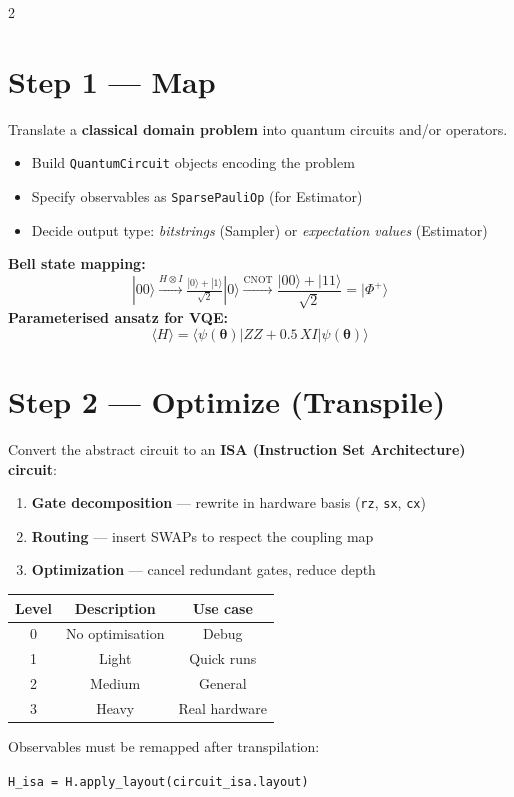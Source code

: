 ﻿\documentclass[10pt, a4paper]{article}
\begin{document}
\begin{multicols}{2}
\section{Step 1 --- Map}
Translate a \textbf{classical domain problem} into quantum circuits and/or operators.
\begin{itemize}
  \item Build \texttt{QuantumCircuit} objects encoding the problem
  \item Specify observables as \texttt{SparsePauliOp} (for Estimator)
  \item Decide output type: \emph{bitstrings} (Sampler) or \emph{expectation values} (Estimator)
\end{itemize}
\noindent\textbf{Bell state mapping:}
\[
  |00\rangle \xrightarrow{H \otimes I} \tfrac{|0\rangle+|1\rangle}{\sqrt{2}}|0\rangle
  \xrightarrow{\text{CNOT}} \frac{|00\rangle+|11\rangle}{\sqrt{2}} = |\Phi^+\rangle
\]
\noindent\textbf{Parameterised ansatz for VQE:}
\[
  \langle H\rangle = \langle\psi(\boldsymbol\theta)|ZZ + 0.5\,XI|\psi(\boldsymbol\theta)\rangle
\]

\section{Step 2 --- Optimize (Transpile)}
Convert the abstract circuit to an \textbf{ISA (Instruction Set Architecture) circuit}:
\begin{enumerate}
  \item \textbf{Gate decomposition} --- rewrite in hardware basis (\texttt{rz}, \texttt{sx}, \texttt{cx})
  \item \textbf{Routing} --- insert SWAPs to respect the coupling map
  \item \textbf{Optimization} --- cancel redundant gates, reduce depth
\end{enumerate}
\begin{center}
\renewcommand{\arraystretch}{1.15}
\begin{tabular}{ccc}
\toprule
\textbf{Level} & \textbf{Description} & \textbf{Use case}\\
\midrule
0 & No optimisation & Debug\\
1 & Light            & Quick runs\\
2 & Medium           & General\\
3 & Heavy            & Real hardware\\
\bottomrule
\end{tabular}
\end{center}
Observables must be remapped after transpilation:\\
\centerline{\texttt{H\_isa = H.apply\_layout(circuit\_isa.layout)}}


\end{multicols}
\end{document}
